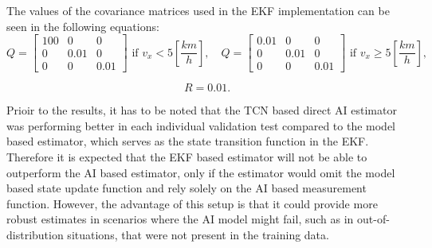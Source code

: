 The values of the covariance matrices used in the EKF implementation can be seen in the following equations:
\begin{equation}
    Q = \begin{bmatrix}
    100 & 0 & 0 \\
    0 & 0.01 & 0 \\
    0 & 0 & 0.01
    \end{bmatrix} \text{ if } v_x < 5 \left[\frac{km}{h}\right], \quad
    Q = \begin{bmatrix}
    0.01 & 0 & 0 \\
    0 & 0.01 & 0 \\
    0 & 0 & 0.01
    \end{bmatrix} \text{ if } v_x \geq 5 \left[\frac{km}{h}\right],
\end{equation}

\begin{equation}
    R = 0.01.
\end{equation}

Prioir to the results, it has to be noted that the TCN based direct AI estimator was performing better in each individual validation test compared to the model based estimator, which serves as the state transition function in the EKF. Therefore it is expected that the EKF based estimator will not be able to outperform the AI based estimator, only if the estimator would omit the model based state update function and rely solely on the AI based measurement function. However, the advantage of this setup is that it could provide more robust estimates in scenarios where the AI model might fail, such as in out-of-distribution situations, that were not present in the training data.

